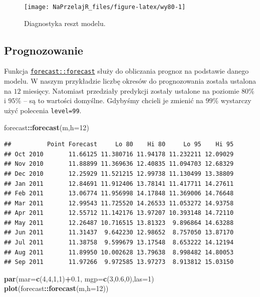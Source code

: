 \documentclass[polish,]{book}
\newenvironment{Shaded}{\begin{snugshade}}{\end{snugshade}}
\newcommand{\DataTypeTok}[1]{\textcolor[rgb]{0.13,0.29,0.53}{#1}}
\newcommand{\DecValTok}[1]{\textcolor[rgb]{0.00,0.00,0.81}{#1}}
\newcommand{\FloatTok}[1]{\textcolor[rgb]{0.00,0.00,0.81}{#1}}
\newcommand{\KeywordTok}[1]{\textcolor[rgb]{0.13,0.29,0.53}{\textbf{#1}}}
\newcommand{\NormalTok}[1]{#1}
\newcommand{\OperatorTok}[1]{\textcolor[rgb]{0.81,0.36,0.00}{\textbf{#1}}}
\begin{document}
\begin{figure}[h]

{\centering \texttt{[image: NaPrzelajR\_files/figure-latex/wy80-1]} 

}

\caption{Diagnostyka reszt modelu.}\label{fig:wy80}
\end{figure}

\hypertarget{part_733}{%
\subsection{Prognozowanie}\label{part_733}}

Funkcja \href{https://rdrr.io/cran/forecast/man/forecast.html}{\texttt{forecast::forecast}} służy do obliczania prognoz na podstawie danego
modelu. W naszym przykładzie liczbę okresów do prognozowania została ustalona
na \(12\) miesięcy. Natomiast przedziały predykcji zostały ustalone na poziomie 80\%
i \(95\%\) -- są to wartości domyślne. Gdybyśmy chcieli je zmienić na \(99\%\) wystarczy użyć polecenia \texttt{level=99}.

\begin{Shaded}
\begin{Highlighting}[]
\NormalTok{forecast}\OperatorTok{::}\KeywordTok{forecast}\NormalTok{(m,}\DataTypeTok{h=}\DecValTok{12}\NormalTok{)}
\end{Highlighting}
\end{Shaded}

\begin{verbatim}
##          Point Forecast     Lo 80    Hi 80     Lo 95    Hi 95
## Oct 2010       11.66125 11.380716 11.94178 11.232211 12.09029
## Nov 2010       11.88899 11.369636 12.40835 11.094703 12.68329
## Dec 2010       12.25929 11.521215 12.99738 11.130499 13.38809
## Jan 2011       12.84691 11.912406 13.78141 11.417711 14.27611
## Feb 2011       13.06774 11.956998 14.17848 11.369006 14.76648
## Mar 2011       12.99543 11.725520 14.26533 11.053272 14.93758
## Apr 2011       12.55712 11.142176 13.97207 10.393148 14.72110
## May 2011       12.26487 10.716515 13.81323  9.896864 14.63288
## Jun 2011       11.31437  9.642230 12.98652  8.757050 13.87170
## Jul 2011       11.38758  9.599679 13.17548  8.653222 14.12194
## Aug 2011       11.89950 10.002628 13.79638  8.998482 14.80053
## Sep 2011       11.97266  9.972585 13.97273  8.913812 15.03150
\end{verbatim}

\begin{Shaded}
\begin{Highlighting}[]
\KeywordTok{par}\NormalTok{(}\DataTypeTok{mar=}\KeywordTok{c}\NormalTok{(}\DecValTok{4}\NormalTok{,}\DecValTok{4}\NormalTok{,}\DecValTok{1}\NormalTok{,}\DecValTok{1}\NormalTok{)}\OperatorTok{+}\FloatTok{0.1}\NormalTok{, }\DataTypeTok{mgp=}\KeywordTok{c}\NormalTok{(}\DecValTok{3}\NormalTok{,}\FloatTok{0.6}\NormalTok{,}\DecValTok{0}\NormalTok{),}\DataTypeTok{las=}\DecValTok{1}\NormalTok{)}
\KeywordTok{plot}\NormalTok{(forecast}\OperatorTok{::}\KeywordTok{forecast}\NormalTok{(m,}\DataTypeTok{h=}\DecValTok{12}\NormalTok{))}
\end{Highlighting}
\end{Shaded}
\end{document}

